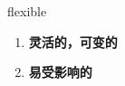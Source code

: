 
\begin{frame}
{\huge flexible}
\begin{center}
\begin{enumerate}\Large
  \item \textbf{灵活的，可变的}
  \item \textbf{易受影响的}
\end{enumerate}
\end{center}
\end{frame}
